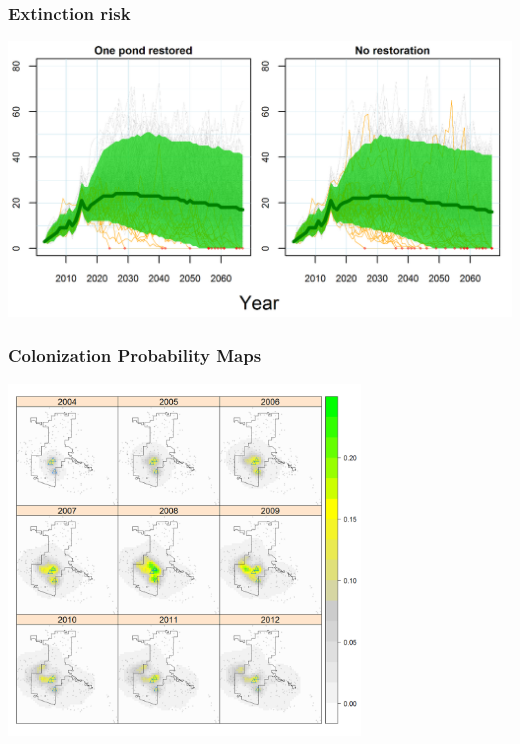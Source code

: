 \documentclass[color=usenames,dvipsnames]{beamer}
\begin{document}
\begin{frame}
  \frametitle{Extinction risk}
  \begin{center}
    \includegraphics[width=\textwidth]{figs/lich-forecasts}
  \end{center}
\end{frame}



\begin{frame}
  \frametitle{Colonization Probability Maps}
  \begin{center}
    \includegraphics[width=0.7\textwidth]{figs/colMap1-9nohill}
  \end{center}
\end{frame}




\end{document}
